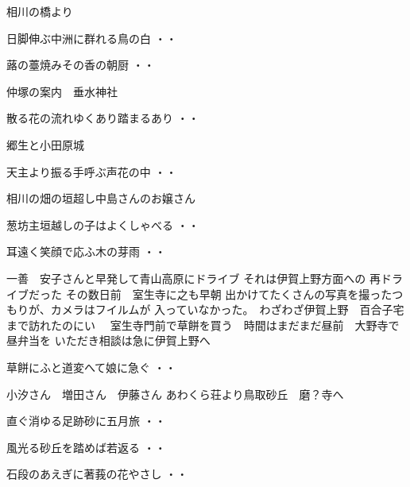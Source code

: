 相川の橋より
\begin{shiika}日脚伸ぶ中洲に群れる鳥の白
\hfill{・・}\end{shiika}
\begin{shiika}蕗の薹焼みその香の朝厨
\hfill{・・}\end{shiika}
\vspace{0.6cm}
仲塚の案内　垂水神社
\begin{shiika}散る花の流れゆくあり踏まるあり
\hfill{・・}\end{shiika}
\vspace{0.6cm}
郷生と小田原城
\begin{shiika}天主より振る手呼ぶ声花の中
\hfill{・・}\end{shiika}
\vspace{0.6cm}
相川の畑の垣超し中島さんのお嬢さん
\begin{shiika}葱坊主垣越しの子はよくしゃべる
\hfill{・・}\end{shiika}
\begin{shiika}耳遠く笑顔で応ふ木の芽雨
\hfill{・・}\end{shiika}
\vspace{0.6cm}
一善　安子さんと早発して青山高原にドライブ
それは伊賀上野方面への
再ドライブだった
その数日前　室生寺に之も早朝
出かけてたくさんの写真を撮ったつもりが、カメラはフイルムが
入っていなかった。　わざわざ伊賀上野　百合子宅まで訪れたのにい
　室生寺門前で草餅を買う　時間はまだまだ昼前　大野寺で昼弁当を
いただき相談は急に伊賀上野へ
\begin{shiika}草餅にふと道変へて娘に急ぐ
\hfill{・・}\end{shiika}
\vspace{0.6cm}
小汐さん　増田さん　伊藤さん あわくら荘より鳥取砂丘　磨？寺へ
\begin{shiika}直ぐ消ゆる足跡砂に五月旅
\hfill{・・}\end{shiika}
\begin{shiika}風光る砂丘を踏めば若返る
\hfill{・・}\end{shiika}
\begin{shiika}石段のあえぎに著莪の花やさし
\hfill{・・}\end{shiika}
